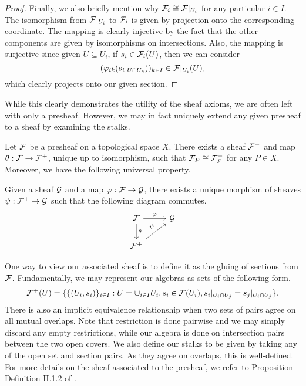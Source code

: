 \begin{proof}
    Finally, we also briefly mention why $\mathcal{F}_i \cong \mathcal{F}|_{U_i}$ for any particular $i \in I$.
    The isomorphism from $\mathcal{F}|_{U_i}$ to $\mathcal{F}_i$ is given by projection onto the corresponding coordinate.
    The mapping is clearly injective by the fact that the other components are given by isomorphisms on intersections. 
    Also, the mapping is surjective since given $U \subseteq U_i$, if $s_i \in \mathcal{F}_i(U)$, then we can consider
    \[
        (\varphi_{ik}(s_i|_{U \cap U_k}))_{k \in I} \in \mathcal{F}|_{U_i}(U),
    \]
    which clearly projects onto our given section.
    \qedhere
    
\end{proof}

While this clearly demonstrates the utility of the sheaf axioms, 
we are often left with only a presheaf.
However, we may in fact uniquely extend any given presheaf to a sheaf by examining the stalks.

\begin{theorem}
    Let $\mathcal{F}$ be a presheaf on a topological space $X$.
    There exists a sheaf $\mathcal{F}^+$ and map $\theta : \mathcal{F} \to \mathcal{F}^+$, 
    unique up to isomorphism, such that $\mathcal{F}_P \cong \mathcal{F}^+_P$ for any $P \in X$.
    Moreover, we have the following universal property. 
    
    Given a sheaf $\mathcal{G}$ and a map $\varphi : \mathcal{F} \to \mathcal{G}$, 
    there exists a unique morphism of sheaves $\psi : \mathcal{F}^+ \to \mathcal{G}$ such that the following diagram commutes.
    \[
        \begin{tikzcd}
            \cF \arrow[r, "\varphi"] \arrow[d, "\theta"] & \cG \\
            \cF^+ \arrow[ur, "\psi"]
        \end{tikzcd}
    \]
\end{theorem}

One way to view our associated sheaf is to define it as the gluing of sections from $\mathcal{F}$.
Fundamentally, we may represent our algebras as sets of the following form.
\[
    \mathcal{F}^+(U) = \{\{(U_i, s_i)\}_{i \in I} : 
        U = \cup_{i \in I} U_i, 
        s_i \in \mathcal{F}(U_i), 
        s_i|_{U_i \cap U_j} = s_j|_{U_i \cap U_j}
    \}.
\]
There is also an implicit equivalence relationship when two sets of pairs agree on all mutual overlaps.
Note that restriction is done pairwise and we may simply discard any empty restrictions,
while our algebra is done on intersection pairs between the two open covers.
We also define our stalks to be given by taking any of the open set and section pairs.
As they agree on overlaps, this is well-defined.
For more details on the sheaf associated to the presheaf,
we refer to Proposition-Definition II.1.2 of \cite{Hartshorne_2013}.


